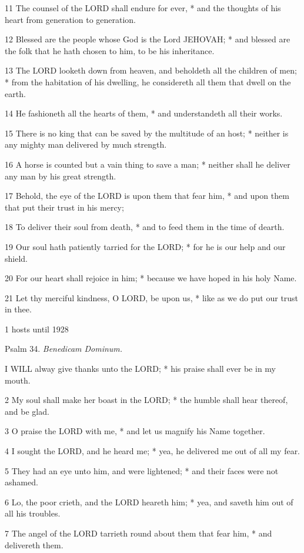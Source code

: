 11 The counsel of the LORD shall
endure for ever, * and the thoughts of his heart from generation to generation.

12 Blessed are the people whose God is the Lord JEHOVAH;
* and blessed are the folk that he hath chosen to him, to be his inheritance.

13 The LORD looketh down from
heaven, and beholdeth all the children of men; * from the habitation of
his dwelling, he considereth all them that dwell on the earth.

14 He fashioneth all the hearts of them, * and understandeth
all their works.

15 There is no king that can be saved by the multitude
of an host; * neither is any mighty man delivered by much strength.

16 A horse is counted but a vain thing to save a man;
* neither shall he deliver any man by his great strength.

17 Behold, the eye of the LORD
is upon them that fear him, * and upon them that put their trust in his
mercy;

18 To deliver their soul from death, * and to feed them
in the time of dearth.

19 Our soul hath patiently tarried for the LORD;
* for he is our help and our shield.

20 For our heart shall rejoice in him; * because we have
hoped in his holy Name.

21 Let thy merciful kindness, O LORD,
be upon us, * like as we do put our trust in thee.

1 hosts until
1928

Psalm
34. \emph{Benedicam Dominum.}

I
WILL alway give thanks unto the LORD; * his praise
shall ever be in my mouth.

2 My soul shall make her boast in the LORD;
* the humble shall hear thereof, and be glad.

3 O praise the LORD with me,
* and let us magnify his Name together.

4 I sought the LORD, and he
heard me; * yea, he delivered me out of all my fear.

5 They had an eye unto him, and were lightened; * and
their faces were not ashamed.

6 Lo, the poor crieth, and the LORD
heareth him; * yea, and saveth him out of all his troubles.

7 The angel of the LORD tarrieth
round about them that fear him, * and delivereth them.

